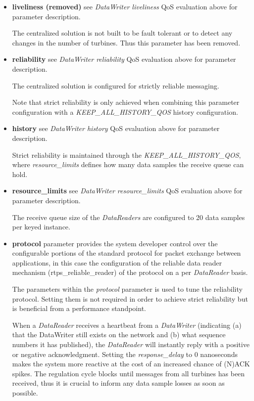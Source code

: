 \begin{itemize}
	\item \textbf{liveliness (removed)} see \textit{DataWriter liveliness} QoS evaluation above for parameter description. 
	
	The centralized solution is not built to be fault tolerant or to detect any changes in the number of turbines. Thus this parameter has been removed.
	
	\item \textbf{reliability} see \textit{DataWriter reliability} QoS evaluation above for parameter description.
	
	The centralized solution is configured for strictly reliable messaging.
	
	Note that strict reliability is only achieved when combining this parameter configuration with a \textit{KEEP\_ALL\_HISTORY\_QOS} history configuration.
	\item \textbf{history} see \textit{DataWriter history} QoS evaluation above for parameter description.
	
	Strict reliability is maintained through the \textit{KEEP\_ALL\_HISTORY\_QOS}, where \textit{resource\_limits} defines how many data samples the receive queue can hold.
	
	\item \textbf{resource\_limits} see \textit{DataWriter resource\_limits} QoS evaluation above for parameter description.
	
	The receive queue size of the \textit{DataReaders} are configured to 20 data samples per keyed instance. 
	\item \textbf{protocol} parameter provides the system developer control over the configurable portions of the standard protocol for packet exchange between applications, in this case the configuration of the reliable data reader mechanism (rtps\_reliable\_reader) of the protocol on a per \textit{DataReader} basis.
	
	The parameters within the \textit{protocol} parameter is used to tune the reliability protocol. Setting them is not required in order to achieve strict reliability but is beneficial from a performance standpoint. 
	
	When a \textit{DataReader} receives a heartbeat from a \textit{DataWriter} (indicating (a) that the DataWriter still exists on the network and (b) what sequence numbers it has published), the \textit{DataReader} will instantly reply with a positive or negative acknowledgment. Setting the \textit{response\_delay} to 0 nanoseconds makes the system more reactive at the cost of an increased chance of (N)ACK spikes. The regulation cycle blocks until messages from all turbines has been received, thus it is crucial to inform any data sample losses as soon as possible.
\end{itemize}


